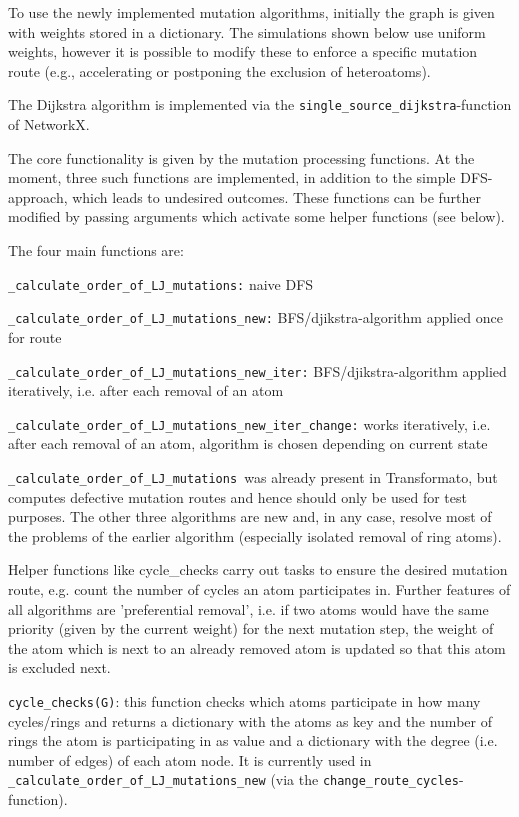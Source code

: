 To use the newly implemented mutation algorithms, initially the graph
is given with weights stored in a dictionary. The simulations shown
below use uniform weights, however it is possible to modify these to
enforce a specific mutation route (e.g., accelerating or postponing
the exclusion of heteroatoms). 

The Dijkstra algorithm is implemented via the \texttt{single\_source\_dijkstra}-function
of NetworkX.

The core functionality is given by the mutation processing functions.
At the moment, three such functions are implemented, in addition to
the simple DFS-approach, which leads to undesired outcomes. These functions
can be further modified by passing arguments which activate some helper
functions (see below).

The four main functions are: 

\texttt{\_calculate\_order\_of\_LJ\_mutations:} naive DFS 

\texttt{\_calculate\_order\_of\_LJ\_mutations\_new:} BFS/djikstra-algorithm
applied once for route

\texttt{\_calculate\_order\_of\_LJ\_mutations\_new\_iter:} BFS/djikstra-algorithm
applied iteratively, i.e. after each removal of an atom 

\texttt{\_calculate\_order\_of\_LJ\_mutations\_new\_iter\_change:}
works iteratively, i.e. after each removal of an atom, algorithm is
chosen depending on current state

\texttt{\_calculate\_order\_of\_LJ\_mutations }was already present in Transformato, but computes defective mutation routes and hence
should only be used for test purposes. The other three algorithms
are new and, in any case, resolve most of the problems of the earlier
algorithm (especially isolated removal of ring atoms).

Helper functions like cycle\_checks carry out tasks to ensure the
desired mutation route, e.g. count the number of cycles an atom participates
in. Further features of all algorithms are 'preferential removal',
i.e. if two atoms would have the same priority (given by the current
weight) for the next mutation step, the weight of the atom which is
next to an already removed atom is updated so that this atom is excluded
next.

\texttt{cycle\_checks(G)}: this function checks which atoms participate
in how many cycles/rings and returns a dictionary with the atoms as
key and the number of rings the atom is participating in as value
and a dictionary with the degree (i.e. number of edges) of each atom
node. It is currently used in \texttt{\_calculate\_order\_of\_LJ\_mutations\_new}
(via the \texttt{change\_route\_cycles}-function).

